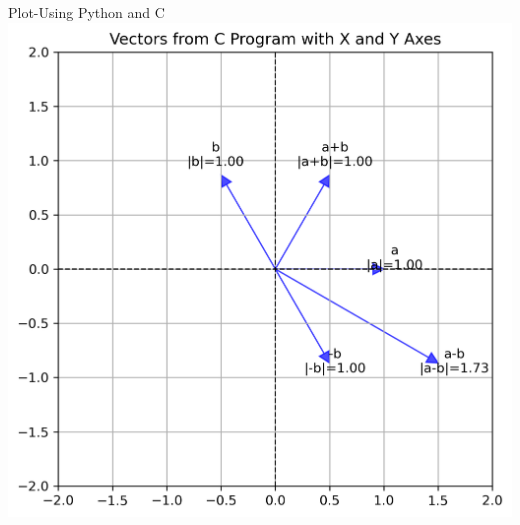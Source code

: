 \documentclass{beamer}
\begin{document}
\begin{frame}{Plot-Using  Python and C}
    \centering
    \includegraphics[width=\columnwidth, height=0.8\textheight, keepaspectratio]{../figs/vectors_from_c.png}     
\end{frame}

	
\end{document}
